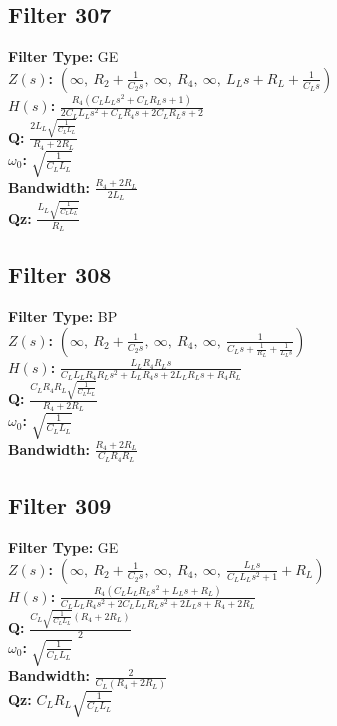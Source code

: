 \documentclass{article}
\begin{document}
\subsection*{Filter 307}
\textbf{Filter Type:} GE \\ 
\textbf{$Z(s)$:} $\left( \infty, \  R_{2} + \frac{1}{C_{2} s}, \  \infty, \  R_{4}, \  \infty, \  L_{L} s + R_{L} + \frac{1}{C_{L} s}\right)$ \\ 
\textbf{$H(s)$:} $\frac{R_{4} \left(C_{L} L_{L} s^{2} + C_{L} R_{L} s + 1\right)}{2 C_{L} L_{L} s^{2} + C_{L} R_{4} s + 2 C_{L} R_{L} s + 2}$ \\ 
\textbf{Q:} $\frac{2 L_{L} \sqrt{\frac{1}{C_{L} L_{L}}}}{R_{4} + 2 R_{L}}$ \\ 
\textbf{$\omega_0$:} $\sqrt{\frac{1}{C_{L} L_{L}}}$ \\ 
\textbf{Bandwidth:} $\frac{R_{4} + 2 R_{L}}{2 L_{L}}$ \\ 
\textbf{Qz:} $\frac{L_{L} \sqrt{\frac{1}{C_{L} L_{L}}}}{R_{L}}$ \\ 
\subsection*{Filter 308}
\textbf{Filter Type:} BP \\ 
\textbf{$Z(s)$:} $\left( \infty, \  R_{2} + \frac{1}{C_{2} s}, \  \infty, \  R_{4}, \  \infty, \  \frac{1}{C_{L} s + \frac{1}{R_{L}} + \frac{1}{L_{L} s}}\right)$ \\ 
\textbf{$H(s)$:} $\frac{L_{L} R_{4} R_{L} s}{C_{L} L_{L} R_{4} R_{L} s^{2} + L_{L} R_{4} s + 2 L_{L} R_{L} s + R_{4} R_{L}}$ \\ 
\textbf{Q:} $\frac{C_{L} R_{4} R_{L} \sqrt{\frac{1}{C_{L} L_{L}}}}{R_{4} + 2 R_{L}}$ \\ 
\textbf{$\omega_0$:} $\sqrt{\frac{1}{C_{L} L_{L}}}$ \\ 
\textbf{Bandwidth:} $\frac{R_{4} + 2 R_{L}}{C_{L} R_{4} R_{L}}$ \\ 
\subsection*{Filter 309}
\textbf{Filter Type:} GE \\ 
\textbf{$Z(s)$:} $\left( \infty, \  R_{2} + \frac{1}{C_{2} s}, \  \infty, \  R_{4}, \  \infty, \  \frac{L_{L} s}{C_{L} L_{L} s^{2} + 1} + R_{L}\right)$ \\ 
\textbf{$H(s)$:} $\frac{R_{4} \left(C_{L} L_{L} R_{L} s^{2} + L_{L} s + R_{L}\right)}{C_{L} L_{L} R_{4} s^{2} + 2 C_{L} L_{L} R_{L} s^{2} + 2 L_{L} s + R_{4} + 2 R_{L}}$ \\ 
\textbf{Q:} $\frac{C_{L} \sqrt{\frac{1}{C_{L} L_{L}}} \left(R_{4} + 2 R_{L}\right)}{2}$ \\ 
\textbf{$\omega_0$:} $\sqrt{\frac{1}{C_{L} L_{L}}}$ \\ 
\textbf{Bandwidth:} $\frac{2}{C_{L} \left(R_{4} + 2 R_{L}\right)}$ \\ 
\textbf{Qz:} $C_{L} R_{L} \sqrt{\frac{1}{C_{L} L_{L}}}$ \\ 
\end{document}
